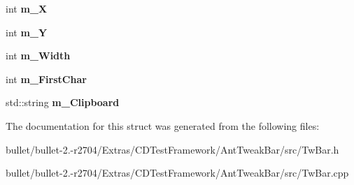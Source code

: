 \begin{DoxyCompactItemize}
\item 
\hypertarget{struct_c_tw_bar_1_1_c_edit_in_place_a453e02412ece9df22852a4d4cf4b5b85}{int {\bfseries m\+\_\+\+X}}\label{struct_c_tw_bar_1_1_c_edit_in_place_a453e02412ece9df22852a4d4cf4b5b85}

\item 
\hypertarget{struct_c_tw_bar_1_1_c_edit_in_place_ab6ac78927cb8b3fbd31d026d4703a519}{int {\bfseries m\+\_\+\+Y}}\label{struct_c_tw_bar_1_1_c_edit_in_place_ab6ac78927cb8b3fbd31d026d4703a519}

\item 
\hypertarget{struct_c_tw_bar_1_1_c_edit_in_place_af26c601a081fcf2495a7699aa9d402be}{int {\bfseries m\+\_\+\+Width}}\label{struct_c_tw_bar_1_1_c_edit_in_place_af26c601a081fcf2495a7699aa9d402be}

\item 
\hypertarget{struct_c_tw_bar_1_1_c_edit_in_place_a8046348ff67a236c87a5644ba84f4386}{int {\bfseries m\+\_\+\+First\+Char}}\label{struct_c_tw_bar_1_1_c_edit_in_place_a8046348ff67a236c87a5644ba84f4386}

\item 
\hypertarget{struct_c_tw_bar_1_1_c_edit_in_place_a1c6ff66d7edd7ff35421d3fb1af40c83}{std\+::string {\bfseries m\+\_\+\+Clipboard}}\label{struct_c_tw_bar_1_1_c_edit_in_place_a1c6ff66d7edd7ff35421d3fb1af40c83}

\end{DoxyCompactItemize}


The documentation for this struct was generated from the following files\+:\begin{DoxyCompactItemize}
\item 
bullet/bullet-\/2.-\/r2704/\+Extras/\+C\+D\+Test\+Framework/\+Ant\+Tweak\+Bar/src/Tw\+Bar.\+h\item 
bullet/bullet-\/2.-\/r2704/\+Extras/\+C\+D\+Test\+Framework/\+Ant\+Tweak\+Bar/src/Tw\+Bar.\+cpp\end{DoxyCompactItemize}
